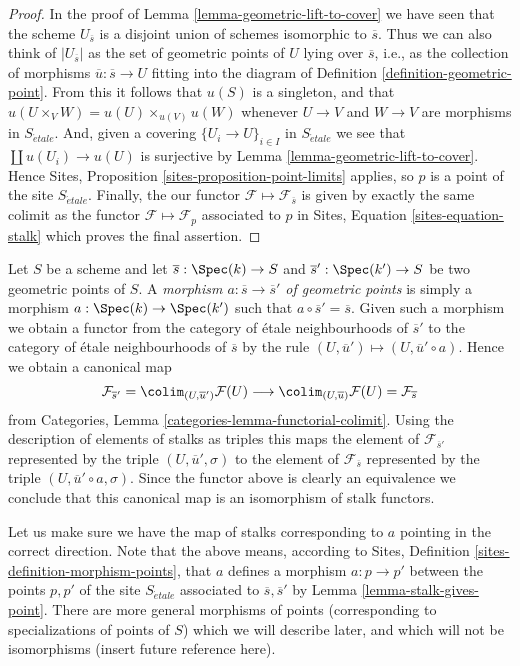 \begin{proof}
In the proof of
Lemma \ref{lemma-geometric-lift-to-cover}
we have seen that the scheme $U_{\overline{s}}$ is a disjoint union of
schemes isomorphic to $\overline{s}$. Thus we can also think of
$|U_{\overline{s}}|$ as the set of geometric points of $U$ lying over
$\overline{s}$, i.e., as the collection of morphisms
$\overline{u} : \overline{s} \to U$ fitting into the diagram of
Definition \ref{definition-geometric-point}.
From this it follows that $u(S)$ is a singleton, and that
$u(U \times_V W) = u(U) \times_{u(V)} u(W)$
whenever $U \to V$ and $W \to V$ are morphisms in $S_{\acute{e}tale}$.
And, given a covering $\{U_i \to U\}_{i \in I}$ in $S_{\acute{e}tale}$
we see that $\coprod u(U_i) \to u(U)$ is surjective by
Lemma \ref{lemma-geometric-lift-to-cover}.
Hence
Sites, Proposition \ref{sites-proposition-point-limits}
applies, so $p$ is a point of the site $S_{\acute{e}tale}$.
Finally, the our functor $\mathcal{F} \mapsto \mathcal{F}_{\overline{s}}$
is given by exactly the same colimit as the functor
$\mathcal{F} \mapsto \mathcal{F}_p$ associated to $p$ in
Sites, Equation \ref{sites-equation-stalk}
which proves the final assertion.
\end{proof}

\begin{remark}
\label{remark-map-stalks}
Let $S$ be a scheme and let $\overline{s} : \Spec(k) \to S$
and $\overline{s}' : \Spec(k') \to S$ be two geometric points of
$S$. A {\it morphism $a : \overline{s} \to \overline{s}'$ of geometric points}
is simply a morphism $a : \Spec(k) \to \Spec(k')$ such that
$a \circ \overline{s}' = \overline{s}$. Given such a morphism we obtain
a functor from the category of \'etale neighbourhoods of $\overline{s}'$
to the category of \'etale neighbourhoods of $\overline{s}$ by the rule
$(U, \overline{u}') \mapsto (U, \overline{u}' \circ a)$. Hence we obtain
a canonical map
$$
\mathcal{F}_{\overline{s}'}
=
\colim_{(U, \overline{u}')} \mathcal{F}(U)
\longrightarrow
\colim_{(U, \overline{u})} \mathcal{F}(U)
=
\mathcal{F}_{\overline{s}}
$$
from Categories, Lemma \ref{categories-lemma-functorial-colimit}. Using the
description of elements of stalks as triples this maps the element of
$\mathcal{F}_{\overline{s}'}$ represented by the triple
$(U, \overline{u}', \sigma)$ to the element of $\mathcal{F}_{\overline{s}}$
represented by the triple $(U, \overline{u}' \circ a, \sigma)$.
Since the functor above is clearly an equivalence we conclude that this
canonical map is an isomorphism of stalk functors.

\medskip\noindent
Let us make sure we have the map of stalks corresponding to $a$ pointing
in the correct direction. Note that the above means, according to
Sites, Definition \ref{sites-definition-morphism-points},
that $a$ defines a morphism $a : p \to p'$ between the points $p, p'$ of
the site $S_{\acute{e}tale}$ associated to $\overline{s}, \overline{s}'$ by
Lemma \ref{lemma-stalk-gives-point}. There are more general morphisms of
points (corresponding to specializations of points of $S$) which we will
describe later, and which will not be isomorphisms (insert future
reference here).
\end{remark}

